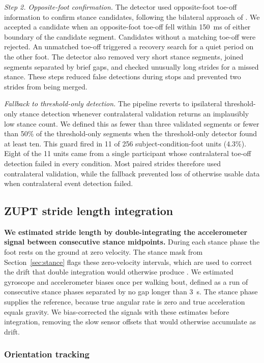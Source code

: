 \documentclass[fleqn,10pt,lineno]{wlpeerj}
\begin{document}
\textit{Step 2. Opposite-foot confirmation.} The detector used opposite-foot toe-off information to confirm stance candidates, following the bilateral approach of \citet{Arens2021}. We accepted a candidate when an opposite-foot toe-off fell within 150~ms of either boundary of the candidate segment. Candidates without a matching toe-off were rejected. An unmatched toe-off triggered a recovery search for a quiet period on the other foot. The detector also removed very short stance segments, joined segments separated by brief gaps, and checked unusually long strides for a missed stance. These steps reduced false detections during stops and prevented two strides from being merged.

\textit{Fallback to threshold-only detection.} The pipeline reverts to ipsilateral threshold-only stance detection whenever contralateral validation returns an implausibly low stance count. We defined this as fewer than three validated segments or fewer than 50\% of the threshold-only segments when the threshold-only detector found at least ten. This guard fired in 11 of 256 subject-condition-foot units (4.3\%). Eight of the 11 units came from a single participant whose contralateral toe-off detection failed in every condition. Most paired strides therefore used contralateral validation, while the fallback prevented loss of otherwise usable data when contralateral event detection failed.

\subsection{ZUPT stride length integration}

\textbf{We estimated stride length by double-integrating the accelerometer signal between consecutive stance midpoints.} During each stance phase the foot rests on the ground at zero velocity. The stance mask from Section~\ref{sec:stance} flags these zero-velocity intervals, which are used to correct the drift that double integration would otherwise produce \citep{Foxlin2005, Skog2010}. We estimated gyroscope and accelerometer biases once per walking bout, defined as a run of consecutive stance phases separated by no gap longer than 3~s. The stance phase supplies the reference, because true angular rate is zero and true acceleration equals gravity. We bias-corrected the signals with these estimates before integration, removing the slow sensor offsets that would otherwise accumulate as drift.

\subsubsection{Orientation tracking}
\end{document}
